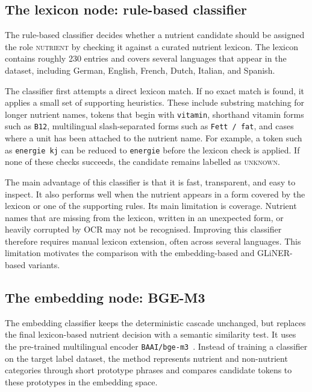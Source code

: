 \subsection{The lexicon node: rule-based classifier}\label{sec:classifier-rule}

The rule-based classifier decides whether a nutrient candidate should be assigned the role \textsc{nutrient} by checking it against a curated nutrient lexicon. The lexicon contains roughly 230 entries and covers several languages that appear in the dataset, including German, English, French, Dutch, Italian, and Spanish.

The classifier first attempts a direct lexicon match. If no exact match is found, it applies a small set of supporting heuristics. These include substring matching for longer nutrient names, tokens that begin with \texttt{vitamin}, shorthand vitamin forms such as \texttt{B12}, multilingual slash-separated forms such as \texttt{Fett / fat}, and cases where a unit has been attached to the nutrient name. For example, a token such as \texttt{energie kj} can be reduced to \texttt{energie} before the lexicon check is applied. If none of these checks succeeds, the candidate remains labelled as \textsc{unknown}.

The main advantage of this classifier is that it is fast, transparent, and easy to inspect. It also performs well when the nutrient appears in a form covered by the lexicon or one of the supporting rules. Its main limitation is coverage. Nutrient names that are missing from the lexicon, written in an unexpected form, or heavily corrupted by OCR may not be recognised. Improving this classifier therefore requires manual lexicon extension, often across several languages. This limitation motivates the comparison with the embedding-based and GLiNER-based variants.

\subsection{The embedding node: BGE-M3}\label{sec:classifier-embedding}

The embedding classifier keeps the deterministic cascade unchanged, but replaces the final lexicon-based nutrient decision with a semantic similarity test. It uses the pre-trained multilingual encoder \texttt{BAAI/bge-m3}~\cite{chen2024bgem3}. Instead of training a classifier on the target label dataset, the method represents nutrient and non-nutrient categories through short prototype phrases and compares candidate tokens to these prototypes in the embedding space.

